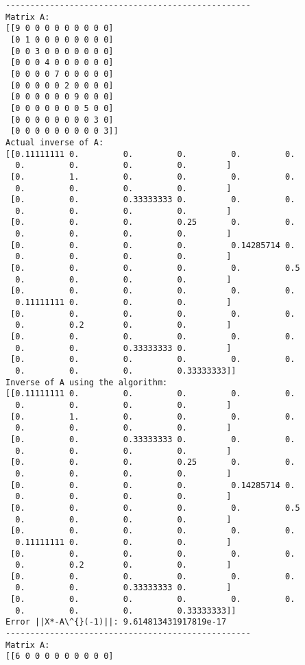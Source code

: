 \documentclass[11pt]{article}
\begin{document}
\begin{Verbatim}[commandchars=\\\{\}]
--------------------------------------------------
Matrix A:
[[9 0 0 0 0 0 0 0 0 0]
 [0 1 0 0 0 0 0 0 0 0]
 [0 0 3 0 0 0 0 0 0 0]
 [0 0 0 4 0 0 0 0 0 0]
 [0 0 0 0 7 0 0 0 0 0]
 [0 0 0 0 0 2 0 0 0 0]
 [0 0 0 0 0 0 9 0 0 0]
 [0 0 0 0 0 0 0 5 0 0]
 [0 0 0 0 0 0 0 0 3 0]
 [0 0 0 0 0 0 0 0 0 3]]
Actual inverse of A:
[[0.11111111 0.         0.         0.         0.         0.
  0.         0.         0.         0.        ]
 [0.         1.         0.         0.         0.         0.
  0.         0.         0.         0.        ]
 [0.         0.         0.33333333 0.         0.         0.
  0.         0.         0.         0.        ]
 [0.         0.         0.         0.25       0.         0.
  0.         0.         0.         0.        ]
 [0.         0.         0.         0.         0.14285714 0.
  0.         0.         0.         0.        ]
 [0.         0.         0.         0.         0.         0.5
  0.         0.         0.         0.        ]
 [0.         0.         0.         0.         0.         0.
  0.11111111 0.         0.         0.        ]
 [0.         0.         0.         0.         0.         0.
  0.         0.2        0.         0.        ]
 [0.         0.         0.         0.         0.         0.
  0.         0.         0.33333333 0.        ]
 [0.         0.         0.         0.         0.         0.
  0.         0.         0.         0.33333333]]
Inverse of A using the algorithm:
[[0.11111111 0.         0.         0.         0.         0.
  0.         0.         0.         0.        ]
 [0.         1.         0.         0.         0.         0.
  0.         0.         0.         0.        ]
 [0.         0.         0.33333333 0.         0.         0.
  0.         0.         0.         0.        ]
 [0.         0.         0.         0.25       0.         0.
  0.         0.         0.         0.        ]
 [0.         0.         0.         0.         0.14285714 0.
  0.         0.         0.         0.        ]
 [0.         0.         0.         0.         0.         0.5
  0.         0.         0.         0.        ]
 [0.         0.         0.         0.         0.         0.
  0.11111111 0.         0.         0.        ]
 [0.         0.         0.         0.         0.         0.
  0.         0.2        0.         0.        ]
 [0.         0.         0.         0.         0.         0.
  0.         0.         0.33333333 0.        ]
 [0.         0.         0.         0.         0.         0.
  0.         0.         0.         0.33333333]]
Error ||X*-A\^{}(-1)||: 9.614813431917819e-17
--------------------------------------------------
Matrix A:
[[6 0 0 0 0 0 0 0 0 0]

\end{Verbatim}
\end{document}
